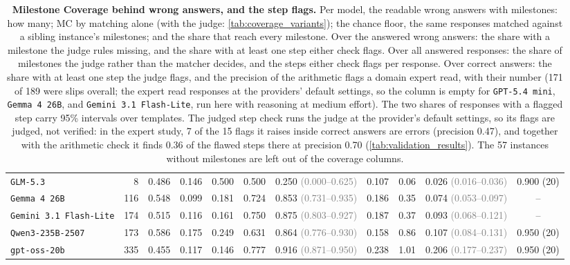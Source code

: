\begin{table}[t]
{\begin{tabular}{l r r r r r c r r c c}
\texttt{GLM-5.3} & 8 & 0.486 & 0.146 & 0.500 & 0.500 & 0.250 {\scriptsize\textcolor{gray}{(0.000--0.625)}} & 0.107 & 0.06 & 0.026 {\scriptsize\textcolor{gray}{(0.016--0.036)}} & 0.900 (20) \\
\texttt{Gemma 4 26B} & 116 & 0.548 & 0.099 & 0.181 & 0.724 & 0.853 {\scriptsize\textcolor{gray}{(0.731--0.935)}} & 0.186 & 0.35 & 0.074 {\scriptsize\textcolor{gray}{(0.053--0.097)}} & -- \\
\texttt{Gemini 3.1 Flash-Lite} & 174 & 0.515 & 0.116 & 0.161 & 0.750 & 0.875 {\scriptsize\textcolor{gray}{(0.803--0.927)}} & 0.187 & 0.37 & 0.093 {\scriptsize\textcolor{gray}{(0.068--0.121)}} & -- \\
\texttt{Qwen3-235B-2507} & 173 & 0.586 & 0.175 & 0.249 & 0.631 & 0.864 {\scriptsize\textcolor{gray}{(0.776--0.930)}} & 0.158 & 0.86 & 0.107 {\scriptsize\textcolor{gray}{(0.084--0.131)}} & 0.950 (20) \\
\texttt{gpt-oss-20b} & 335 & 0.455 & 0.117 & 0.146 & 0.777 & 0.916 {\scriptsize\textcolor{gray}{(0.871--0.950)}} & 0.238 & 1.01 & 0.206 {\scriptsize\textcolor{gray}{(0.177--0.237)}} & 0.950 (20) \\
\bottomrule
\end{tabular}
}
\caption{\textbf{Milestone Coverage behind wrong answers, and the step flags.} Per model, the
readable wrong answers with milestones: how many; MC by matching alone (with the judge:
\autoref{tab:coverage_variants}); the chance floor, the same responses matched against a sibling
instance's milestones; and the share that reach every milestone. Over the answered wrong answers:
the share with a milestone the judge rules missing, and the share with at least one step either
check flags. Over all answered responses: the share of milestones the judge rather than the matcher
decides, and the steps either check flags per response. Over correct answers: the share with at
least one step the judge flags, and the precision of the arithmetic flags a domain expert read, with
their number (171 of 189 were slips overall; the expert read responses at the providers' default
settings, so the column is empty for \texttt{GPT-5.4 mini}, \texttt{Gemma 4 26B}, and
\texttt{Gemini 3.1 Flash-Lite}, run here with reasoning at medium effort). The two shares of
responses with a flagged step carry 95\% intervals over templates. The judged step check runs the
judge at the provider's default settings, so its flags are judged, not verified: in the expert
study, 7 of the 15 flags it raises inside correct answers are errors (precision 0.47), and together
with the arithmetic check it finds 0.36 of the flawed steps there at precision 0.70
(\autoref{tab:validation_results}). The 57 instances without milestones are left out of the coverage
columns.}
\label{tab:coverage}
\label{tab:judged_steps}
\end{table}

